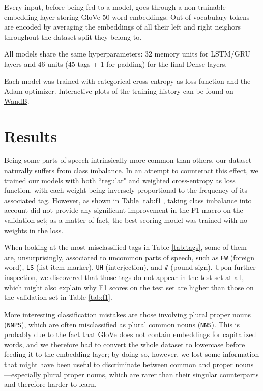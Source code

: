 \documentclass[10pt]{article}
\newcommand{\fw}{\texttt{FW}}
\newcommand{\uh}{\texttt{UH}}
\newcommand{\pound}{\texttt{\#}}
\newcommand{\nnps}{\texttt{NNPS}}
\newcommand{\ls}{\texttt{LS}}
\newcommand{\nns}{\texttt{NNS}}
\begin{document}
Every input, before being fed to a model, goes through a non-trainable embedding layer storing GloVe-50 word embeddings. Out-of-vocabulary tokens are encoded by averaging the embeddings of all their left and right neighors throughout the dataset split they belong to. 

All models share the same hyperparameters: 32 memory units for LSTM/GRU layers and 46 units (45 tags + 1 for padding) for the final Dense layers.

Each model was trained with categorical cross-entropy as loss function and the Adam optimizer. Interactive plots of the training history can be found on \href{https://wandb.ai/frantoman/NLP-POS-Tagging/reports/Model-Comparison-Training-Validation---VmlldzoxMjk0Nzc2}{WandB}. 


\section{Results}
Being some parts of speech intrinsically more common than others, our dataset naturally suffers from class imbalance. In an attempt to counteract this effect, we trained our models with both ``regular" and weighted cross-entropy as loss function, with each weight being inversely proportional to the frequency of its associated tag. However, as shown in Table \ref{tab:f1}, taking class imbalance into account did not provide any significant improvement in the F1-macro on the validation set; as a matter of fact, the best-scoring model was trained with no weights in the loss.

When looking at the most misclassified tags in Table \ref{tab:tags}, some of them are, unsurprisingly, associated to uncommon parts of speech, such as \fw{} (foreign word), \ls{} (list item marker), \uh{} (interjection), and \pound{} (pound sign). Upon further inspection, we discovered that those tags do not appear in the test set at all, which might also explain why F1 scores on the test set are higher than those on the validation set in Table \ref{tab:f1}. 

More interesting classification mistakes are those involving plural proper nouns (\nnps), which are often misclassified as plural common nouns (\nns). This is probably due to the fact that GloVe does not contain embeddings for capitalized words, and we therefore had to convert the whole dataset to lowercase before feeding it to the embedding layer; by doing so, however, we lost some information that might have been useful to discriminate between common and proper nouns---especially plural proper nouns, which are rarer than their singular counterparts and therefore harder to learn.
\end{document}
